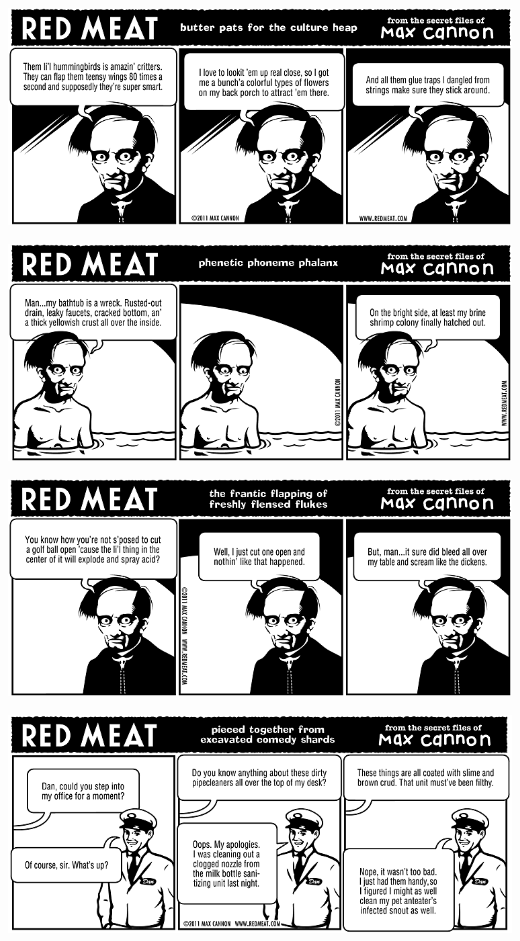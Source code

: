 \documentclass[a4paper,twoside,11pt]{article}
\begin{document}
\includegraphics[width=\textwidth]{redmeat_2011-02-08.png}



\includegraphics[width=\textwidth]{redmeat_2011-02-15.png}



\includegraphics[width=\textwidth]{redmeat_2011-02-22.png}



\includegraphics[width=\textwidth]{redmeat_2011-03-01.png}
\end{document}

